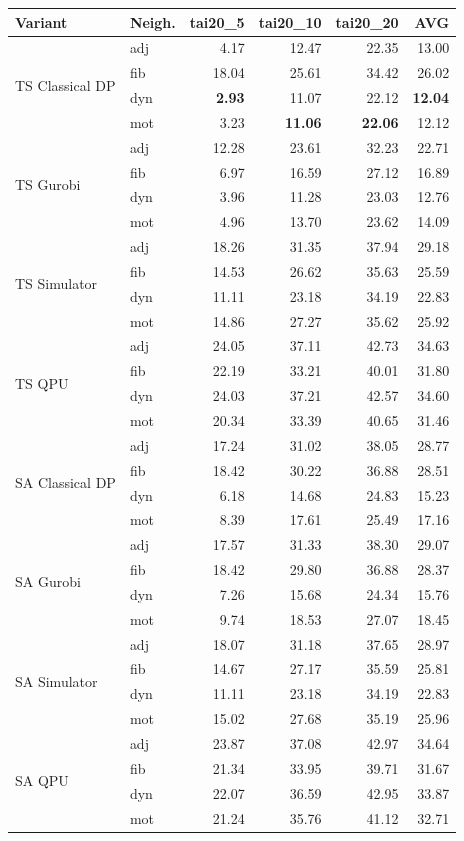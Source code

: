 \setlength{\tabcolsep}{3pt}
\begin{tabular}{@{}ll rrrr@{}}
\textbf{Variant} & \textbf{Neigh.} & tai20\_5 & tai20\_10 & tai20\_20 & \textbf{AVG} \\
\hline
\multirow{4}{*}{TS Classical DP} & adj & 4.17 & 12.47 & 22.35 & 13.00 \\
 & fib & 18.04 & 25.61 & 34.42 & 26.02 \\
 & dyn & {\bfseries 2.93} & 11.07 & 22.12 & {\bfseries 12.04} \\
 & mot & 3.23 & {\bfseries 11.06} & {\bfseries 22.06} & 12.12 \\
\hline
\multirow{4}{*}{TS Gurobi} & adj & 12.28 & 23.61 & 32.23 & 22.71 \\
 & fib & 6.97 & 16.59 & 27.12 & 16.89 \\
 & dyn & 3.96 & 11.28 & 23.03 & 12.76 \\
 & mot & 4.96 & 13.70 & 23.62 & 14.09 \\
\hline
\multirow{4}{*}{TS Simulator} & adj & 18.26 & 31.35 & 37.94 & 29.18 \\
 & fib & 14.53 & 26.62 & 35.63 & 25.59 \\
 & dyn & 11.11 & 23.18 & 34.19 & 22.83 \\
 & mot & 14.86 & 27.27 & 35.62 & 25.92 \\
\hline
\multirow{4}{*}{TS QPU} & adj & 24.05 & 37.11 & 42.73 & 34.63 \\
 & fib & 22.19 & 33.21 & 40.01 & 31.80 \\
 & dyn & 24.03 & 37.21 & 42.57 & 34.60 \\
 & mot & 20.34 & 33.39 & 40.65 & 31.46 \\
\hline
\multirow{4}{*}{SA Classical DP} & adj & 17.24 & 31.02 & 38.05 & 28.77 \\
 & fib & 18.42 & 30.22 & 36.88 & 28.51 \\
 & dyn & 6.18 & 14.68 & 24.83 & 15.23 \\
 & mot & 8.39 & 17.61 & 25.49 & 17.16 \\
\hline
\multirow{4}{*}{SA Gurobi} & adj & 17.57 & 31.33 & 38.30 & 29.07 \\
 & fib & 18.42 & 29.80 & 36.88 & 28.37 \\
 & dyn & 7.26 & 15.68 & 24.34 & 15.76 \\
 & mot & 9.74 & 18.53 & 27.07 & 18.45 \\
\hline
\multirow{4}{*}{SA Simulator} & adj & 18.07 & 31.18 & 37.65 & 28.97 \\
 & fib & 14.67 & 27.17 & 35.59 & 25.81 \\
 & dyn & 11.11 & 23.18 & 34.19 & 22.83 \\
 & mot & 15.02 & 27.68 & 35.19 & 25.96 \\
\hline
\multirow{4}{*}{SA QPU} & adj & 23.87 & 37.08 & 42.97 & 34.64 \\
 & fib & 21.34 & 33.95 & 39.71 & 31.67 \\
 & dyn & 22.07 & 36.59 & 42.95 & 33.87 \\
 & mot & 21.24 & 35.76 & 41.12 & 32.71 \\
\hline
\end{tabular}
